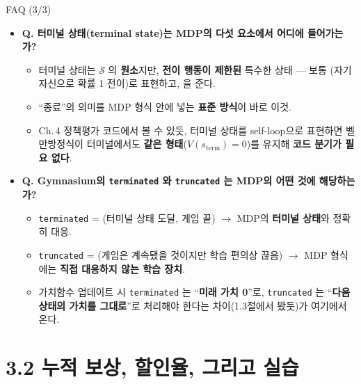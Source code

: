 \documentclass[aspectratio=169,11pt]{beamer}
\begin{document}
\begin{frame}{FAQ (3/3)}
  \begin{itemize}
    \item \textbf{Q. 터미널 상태(terminal state)는 MDP의 다섯
      요소에서 어디에 들어가는가?}
      \begin{itemize}
        \item 터미널 상태는 $\mathcal{S}$ 의 \textbf{원소}지만,
          \textbf{전이 행동이 제한된} 특수한 상태 --- 보통
          (자기 자신으로 확률 1 전이)로 표현하고,
          을 준다.
        \item ``종료''의 의미를 MDP 형식 안에 넣는 \textbf{표준
          방식}이 바로 이것.
        \item Ch.\,4 정책평가 코드에서 볼 수 있듯, 터미널 상태를
          self-loop으로 표현하면 벨만방정식이 터미널에서도
          \textbf{같은 형태}($V(s_{\text{term}}) = 0$)를 유지해
          \textbf{코드 분기가 필요 없다}.
      \end{itemize}
    \item \textbf{Q. Gymnasium의 \texttt{terminated} 와
      \texttt{truncated} 는 MDP의 어떤 것에 해당하는가?}
      \begin{itemize}
        \item \texttt{terminated} = (터미널 상태
          도달, 게임 끝) $\to$ MDP의 \textbf{터미널 상태}와
          정확히 대응.
        \item \texttt{truncated} = (게임은
          계속됐을 것이지만 학습 편의상 끊음) $\to$ MDP 형식에는
          \textbf{직접 대응하지 않는 학습 장치}.
        \item 가치함수 업데이트 시 \texttt{terminated} 는
          ``\textbf{미래 가치 0}''로, \texttt{truncated} 는
          ``\textbf{다음 상태의 가치를 그대로}''로 처리해야
          한다는 차이(1.3절에서 봤듯)가 여기에서 온다.
      \end{itemize}
  \end{itemize}
\end{frame}

\section{3.2 누적 보상, 할인율, 그리고 실습}
\end{document}
